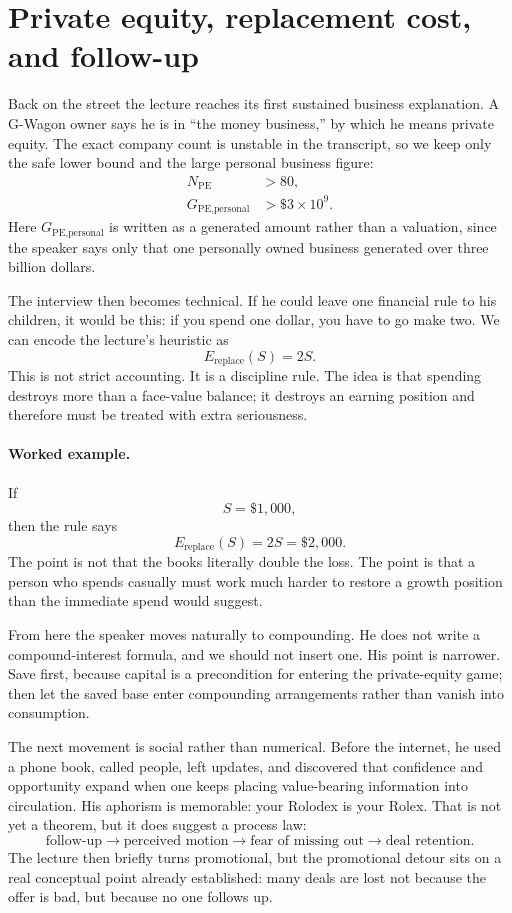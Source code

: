 \section{Private equity, replacement cost, and follow-up}

Back on the street the lecture reaches its first sustained business explanation. A G-Wagon owner says he is in ``the money business,'' by which he means private equity. The exact company count is unstable in the transcript, so we keep only the safe lower bound and the large personal business figure:
\begin{align}
N_{\text{PE}} &> 80,\\
G_{\text{PE,personal}} &> \$3\times 10^{9}.
\end{align}
Here \(G_{\text{PE,personal}}\) is written as a generated amount rather than a valuation, since the speaker says only that one personally owned business generated over three billion dollars.

The interview then becomes technical. If he could leave one financial rule to his children, it would be this: if you spend one dollar, you have to go make two. We can encode the lecture's heuristic as
\begin{equation}
E_{\text{replace}}(S) = 2S.
\end{equation}
This is not strict accounting. It is a discipline rule. The idea is that spending destroys more than a face-value balance; it destroys an earning position and therefore must be treated with extra seriousness.

\paragraph{Worked example.} If
\[
S=\$1{,}000,
\]
then the rule says
\[
E_{\text{replace}}(S)=2S=\$2{,}000.
\]
The point is not that the books literally double the loss. The point is that a person who spends casually must work much harder to restore a growth position than the immediate spend would suggest.

From here the speaker moves naturally to compounding. He does not write a compound-interest formula, and we should not insert one. His point is narrower. Save first, because capital is a precondition for entering the private-equity game; then let the saved base enter compounding arrangements rather than vanish into consumption.

The next movement is social rather than numerical. Before the internet, he used a phone book, called people, left updates, and discovered that confidence and opportunity expand when one keeps placing value-bearing information into circulation. His aphorism is memorable: your Rolodex is your Rolex. That is not yet a theorem, but it does suggest a process law:
\begin{equation}
\text{follow-up} \to \text{perceived motion} \to \text{fear of missing out} \to \text{deal retention}.
\end{equation}
The lecture then briefly turns promotional, but the promotional detour sits on a real conceptual point already established: many deals are lost not because the offer is bad, but because no one follows up.

